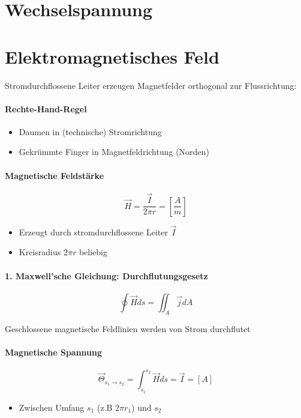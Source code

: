 \section{Wechselspannung}

\section{Elektromagnetisches Feld}

Stromdurchflossene Leiter erzeugen Magnetfelder orthogonal zur Flussrichtung:

\paragraph{Rechte-Hand-Regel}

\begin{itemize}
  \item Daumen in (technische) Stromrichtung
  \item Gekrümmte Finger in Magnetfeldrichtung (Norden)
\end{itemize}

\paragraph{Magnetische Feldstärke}

$$\vec{H} = \frac{\vec{I}}{2\pi r} = \left[\frac{A}{m}\right]$$

\begin{itemize}
  \item Erzeugt durch stromdurchflossene Leiter $\vec{I}$
  \item Kreisradius $2\pi r$ beliebig
\end{itemize}

\paragraph{1. Maxwell'sche Gleichung: Durchflutungsgesetz}

$$\oint \vec{H} ds = \iint_A \vec{j} dA$$

Geschlossene magnetische Feldlinien werden von Strom durchflutet

\paragraph{Magnetische Spannung}

$$\vec{\Theta}_{s_1 \rightarrow s_2} = \int_{s_1}^{s_2} \vec{H} ds = \vec{I} = [A]$$

\begin{itemize}
  \item Zwischen Umfang $s_1$ (z.B $2\pi r_1$) und $s_2$
\end{itemize}
